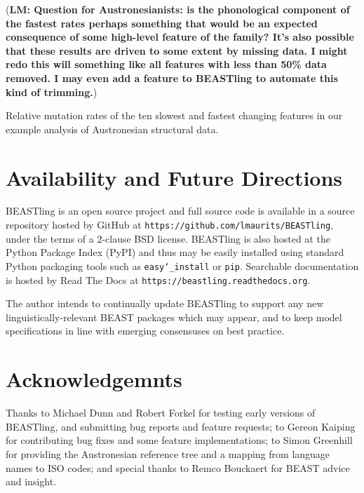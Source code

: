 \documentclass[twocolumn,10pt]{scrartcl}
\begin{document}
(\textbf{LM: Question for Austronesianists: is the phonological component of the fastest rates perhaps something that would be an expected consequence of some high-level feature of the family?  It's also possible that these results are driven to some extent by missing data.  I might redo this will something like all features with less than 50\% data removed.  I may even add a feature to BEASTling to automate this kind of trimming.})

\begin{table*}[ht]
	\begin{center}
		
	\end{center}
	\caption{Relative mutation rates of the ten slowest and fastest changing features in our example analysis of Austronesian structural data.}
\label{tab:austro}
\end{table*}

\section{Availability and Future Directions}

BEASTling is an open source project and full source code is available in a source repository hosted by GitHub at \texttt{https://github.com/lmaurits/BEASTling}, under the terms of a 2-clause BSD license.  BEASTling is also hosted at the Python Package Index (PyPI) and thus may be easily installed using standard Python packaging tools such as \texttt{easy\char`_install} or \texttt{pip}.  Searchable documentation is hosted by Read The Docs at \texttt{https://beastling.readthedocs.org}.

The author intends to continually update BEASTling to support any new linguistically-relevant BEAST packages which may appear, and to keep model specifications in line with emerging consensuses on best practice.

\section{Acknowledgemnts}

Thanks to Michael Dunn and Robert Forkel for testing early versions of BEASTling, and submitting bug reports and feature requests; to Gereon Kaiping for contributing bug fixes and some feature implementations; to Simon Greenhill for providing the Austronesian reference tree and a mapping from language names to ISO codes; and special thanks to Remco Bouckaert for BEAST advice and insight.




\end{document}
